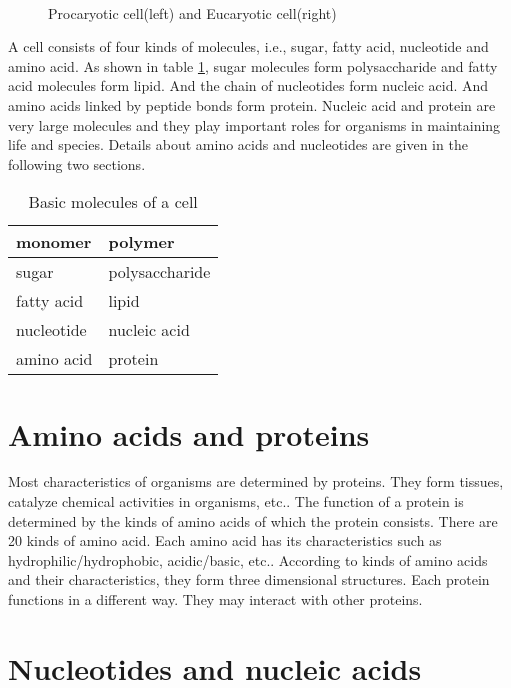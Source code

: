 \begin{figure}
\begin{center}
\ \ \ \ \ \ \ 
\end{center}
\caption{Procaryotic cell(left) and Eucaryotic cell(right)}
\label{cell_ap}
\end{figure}

A cell consists of four kinds of molecules, i.e., sugar, fatty acid,
nucleotide and amino acid. As shown in table \ref{basic_mol},
sugar molecules form polysaccharide and
fatty acid molecules form lipid. And the chain of nucleotides form
nucleic acid.  And amino acids linked by peptide bonds form protein.
Nucleic acid and protein are very large molecules and they play
important roles for organisms in maintaining life and species.
Details about amino acids and nucleotides are given in the following
two sections.

\begin{table}
\begin{center}
\begin{tabular}{|l|l|}
\hline
monomer & polymer\\
\hline
\hline
sugar & polysaccharide \\
fatty acid & lipid \\
nucleotide & nucleic acid \\
amino acid & protein \\
\hline
\end{tabular}

\end{center}
\caption{Basic molecules of a cell}
\label{basic_mol}
\end{table}

\section{Amino acids and proteins}

Most characteristics of organisms are determined by proteins. They form
tissues, catalyze chemical activities in organisms, etc.. The function
of a protein is determined by the kinds of amino acids of which the protein
consists. There are 20 kinds of amino acid. Each amino acid has its
characteristics such as hydrophilic/hydrophobic, acidic/basic,
etc.. According to kinds of amino acids and their characteristics, they
form three dimensional structures. Each protein functions in a different
way. They may interact with other proteins.


\section{Nucleotides and nucleic acids}

